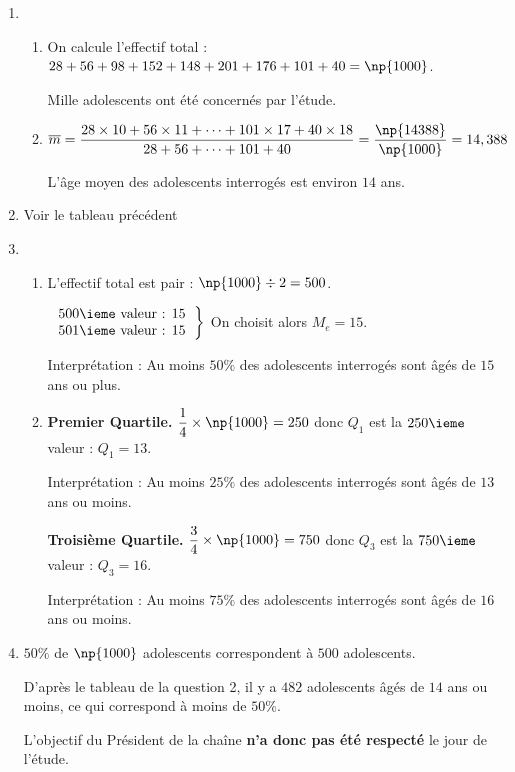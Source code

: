 \documentclass[10pt,french]{article}
\begin{document}
\begin{enumerate}[label=\arabic*.]
    \item
        \begin{enumerate}[label=\alph*)]
            \item On calcule l'effectif total :
                $28 + 56 + 98 + 152 + 148 + 201 + 176 + 101 + 40 = \np{1000}$.\par
                Mille adolescents ont été concernés par l'étude.
            \item $\overline{m}=\dfrac{28 \times 10 + 56\times 11 + \cdots + 101 \times 17 + 40 \times 18}{28 + 56 + \cdots + 101 + 40}=\dfrac{\np{14388}}{\np{1000}}=14,388$

                L'âge moyen des adolescents interrogés est environ $14$ ans.
        \end{enumerate}
    \item Voir le tableau précédent

    \item
        \begin{enumerate}[label=\alph*)]
            \item L'effectif total est pair : $\np{1000} \div 2 = 500$.\par
                $\left.\begin{tabular}{r}
                    500\ieme valeur : 15 \\
                    501\ieme valeur : 15
                \end{tabular}\right\}$ On choisit alors $M_e = 15$.\par
                Interprétation : Au moins $50\%$ des adolescents interrogés sont âgés de $15$ ans ou plus.
            \item \textbf{Premier Quartile.} $\dfrac 1 4 \times \np{1000} = 250$ donc $Q_1$ est la $250\ieme$ valeur : $Q_1 = 13$.\par
                Interprétation : Au moins $25\%$ des adolescents interrogés sont âgés de $13$ ans ou moins.

                \textbf{Troisième Quartile.} $\dfrac 3 4 \times \np{1000} = 750$ donc $Q_3$ est la $750\ieme$ valeur : $Q_3 = 16$.\par
                Interprétation : Au moins $75\%$ des adolescents interrogés sont âgés de $16$ ans ou moins.

        \end{enumerate}
    \item $50\%$ de $\np{1000}$ adolescents correspondent à $500$ adolescents.

    D'après le tableau de la question 2, il y a $482$ adolescents âgés de $14$ ans ou moins, ce qui correspond à moins de $50\%$.

    L'objectif du Président de la chaîne \textbf{n'a donc pas été respecté} le jour de l'étude.
\end{enumerate}
\end{document}
